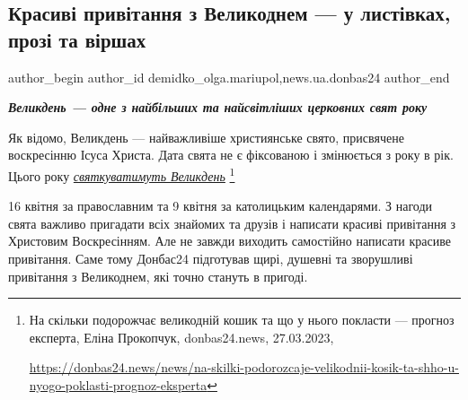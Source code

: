  
 
 
 
 
 
\subsection{Красиві привітання з Великоднем — у листівках, прозі та віршах}
\label{sec:03_04_2023.stz.news.ua.donbas24.1.krasyvi_pryvitannja_z_velykodnem}
 
\ifcmt
 author_begin
   author_id demidko_olga.mariupol,news.ua.donbas24
 author_end
\fi

\begin{center}
  \em\color{blue}\bfseries\Large
  Великдень — одне з найбільших та найсвітліших церковних свят року
\end{center}

Як відомо, Великдень — найважливіше християнське свято, присвячене воскресінню
Ісуса Христа. Дата свята не є фіксованою і змінюється з року в рік. Цього року
\href{https://donbas24.news/news/na-skilki-podorozcaje-velikodnii-kosik-ta-shho-u-nyogo-poklasti-prognoz-eksperta}{\emph{святкуватимуть Великдень}}%
\footnote{На скільки подорожчає великодній кошик та що у нього покласти — прогноз експерта, Еліна Прокопчук, donbas24.news, 27.03.2023, \par\url{https://donbas24.news/news/na-skilki-podorozcaje-velikodnii-kosik-ta-shho-u-nyogo-poklasti-prognoz-eksperta}}

16 квітня за православним та 9 квітня за католицьким
календарями. З нагоди свята важливо пригадати всіх знайомих та друзів і
написати красиві привітання з Христовим Воскресінням. Але не завжди виходить
самостійно написати красиве привітання. Саме тому Донбас24 підготував щирі,
душевні та зворушливі привітання з Великоднем, які точно стануть в пригоді.


